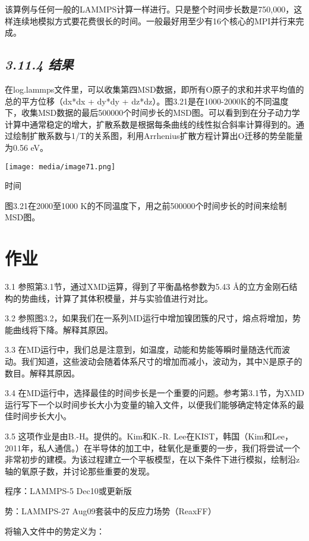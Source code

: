 \documentclass[
]{article}
\begin{document}
该算例与任何一般的LAMMPS计算一样进行。只是整个时间步长数是750,000，这样连续地模拟方式要花费很长的时间。一般最好用至少有16个核心的MPI并行来完成。

\hypertarget{ux7ed3ux679c-10}{%
\subsection{\texorpdfstring{\emph{3.11.4
结果}}{3.11.4 结果}}\label{ux7ed3ux679c-10}}

在log.lammps文件里，可以收集第四MSD数据，即所有O原子的求和并求平均值的总的平方位移（dx*dx
+ dy*dy +
dz*dz）。图3.21是在1000-2000K的不同温度下，收集MSD数据的最后500000个时间步长的MSD图。可以看到到在分子动力学计算中通常稳定的增大，扩散系数是根据每条曲线的线性拟合斜率计算得到的。通过绘制扩散系数与1/T的关系图，利用Arrhenius扩散方程计算出O迁移的势垒能量为0.56
eV。

\texttt{[image: media/image71.png]}

时间

图3.21在2000至1000
K的不同温度下，用之前500000个时间步长的时间来绘制MSD图。

\hypertarget{ux4f5cux4e1a}{%
\section{作业}\label{ux4f5cux4e1a}}

3.1 参照第3.1节，通过XMD运算，得到了平衡晶格参数为5.43
Å的立方金刚石结构的势曲线，计算了其体积模量，并与实验值进行对比。

3.2
参照图3.2，如果我们在一系列MD运行中增加镍团簇的尺寸，熔点将增加，势能曲线将下降。解释其原因。

3.3
在MD运行中，我们总是注意到，如温度，动能和势能等瞬时量随迭代而波动。我们知道，这些波动会随着体系尺寸的增加而减小，波动为，其中N是原子的数目。解释其原因。

3.4
在MD运行中，选择最佳的时间步长是一个重要的问题。参考第3.1节，为XMD运行写下一个以时间步长大小为变量的输入文件，以便我们能够确定特定体系的最佳时间步长大小。

3.5 这项作业是由B.-H。提供的。Kim和K.-R.
Lee在KIST，韩国（Kim和Lee，2011年，私人通信。）在半导体的加工中，硅氧化是重要的一步，我们将尝试一个非常初步的建模。为该过程建立一个平板模型，在以下条件下进行模拟，绘制沿z轴的氧原子数，并讨论那些重要的发现。

程序：LAMMPS-5 Dec10或更新版

势：LAMMPS-27 Aug09套装中的反应力场势（ReaxFF）

将输入文件中的势定义为：
\end{document}
